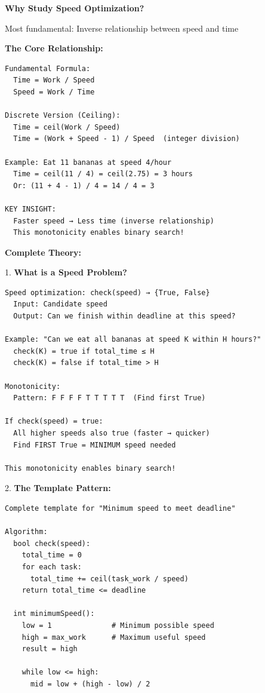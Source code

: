 \documentclass[11pt,a4paper,oneside]{book}
\begin{document}
\begin{tcolorbox}[
    enhanced,breakable,
    colback=white,
    colframe=deepblue,
    boxrule=1.5pt,
    arc=3mm,
    title=\textbf{The Time-Rate Relationship}
]
\textbf{Why Study Speed Optimization?}

Most fundamental: Inverse relationship between speed and time

\textbf{The Core Relationship:}
\begin{verbatim}
Fundamental Formula:
  Time = Work / Speed
  Speed = Work / Time
  
Discrete Version (Ceiling):
  Time = ceil(Work / Speed)
  Time = (Work + Speed - 1) / Speed  (integer division)
  
Example: Eat 11 bananas at speed 4/hour
  Time = ceil(11 / 4) = ceil(2.75) = 3 hours
  Or: (11 + 4 - 1) / 4 = 14 / 4 = 3

KEY INSIGHT:
  Faster speed → Less time (inverse relationship)
  This monotonicity enables binary search!
\end{verbatim}

\textbf{Complete Theory:}

1. \textbf{What is a Speed Problem?}
\begin{verbatim}
Speed optimization: check(speed) → {True, False}
  Input: Candidate speed
  Output: Can we finish within deadline at this speed?

Example: "Can we eat all bananas at speed K within H hours?"
  check(K) = true if total_time ≤ H
  check(K) = false if total_time > H

Monotonicity:
  Pattern: F F F F T T T T T  (Find first True)

If check(speed) = true:
  All higher speeds also true (faster → quicker)
  Find FIRST True = MINIMUM speed needed

This monotonicity enables binary search!
\end{verbatim}

2. \textbf{The Template Pattern:}
\begin{verbatim}
Complete template for "Minimum speed to meet deadline"

Algorithm:
  bool check(speed):
    total_time = 0
    for each task:
      total_time += ceil(task_work / speed)
    return total_time <= deadline
  
  int minimumSpeed():
    low = 1              # Minimum possible speed
    high = max_work      # Maximum useful speed
    result = high
    
    while low <= high:
      mid = low + (high - low) / 2
      

\end{verbatim}
\end{tcolorbox}
\end{document}

